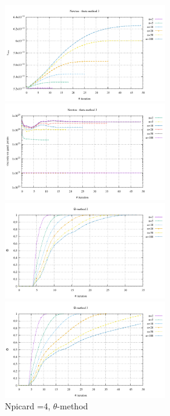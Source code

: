 \begin{center}
\includegraphics[width=7cm]{python_codes/fieldstone_87/results/experiment_10/vrms_meth3.pdf}
\includegraphics[width=7cm]{python_codes/fieldstone_87/results/experiment_10/stats_etaq_meth3.pdf}\\
\includegraphics[width=7cm]{python_codes/fieldstone_87/results/experiment_10/theta_meth2.pdf}
\includegraphics[width=7cm]{python_codes/fieldstone_87/results/experiment_10/theta_meth3.pdf}\\
{\captionfont Npicard =4, $\theta$-method}
\end{center}


